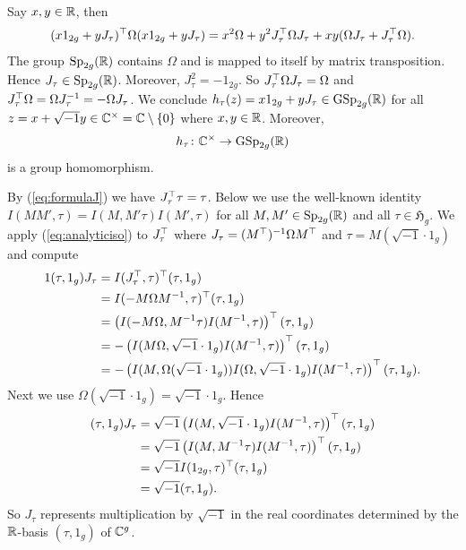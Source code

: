 \documentclass[12pt,oneside]{amsart}
\begin{document}
Say $x,y\in{\mathbb{R}}$, then
\begin{equation*}
  (x1_{2g}+yJ_\tau)^\top \Omega (x1_{2g}+yJ_\tau) = x^2 \Omega +y^2 J_\tau^\top \Omega J_\tau +
  xy(\Omega J_\tau + J_\tau^\top\Omega). 
\end{equation*}
The group $\mathrm{Sp}_{2g}({\mathbb{R}})$ contains $\Omega$ and is mapped to
itself by matrix transposition. Hence $J_\tau\in \mathrm{Sp}_{2g}({\mathbb{R}})$.
Moreover, $J_\tau^2 = -1_{2g}$.
So $J_\tau^\top \Omega J_\tau=\Omega$
and $J_\tau^\top \Omega = \Omega J_\tau^{-1} = -\Omega J_\tau$. We conclude $h_\tau(z) = x 1_{2g}+y J_\tau \in
\mathrm{GSp}_{2g}({\mathbb{R}})$ for all
$z=x+\sqrt{-1}y\in{\mathbb{C}}^\times={\mathbb{C}}\setminus\{0\}$ where $x,y\in{\mathbb{R}}$.
Moreover, 
\begin{equation*}
  h_\tau \colon {\mathbb{C}}^\times \rightarrow\mathrm{GSp}_{2g}({\mathbb{R}})
\end{equation*}
is a group homomorphism. 



By (\ref{eq:formulaJ}) we have $J_\tau^\top \tau = \tau$. 
Below we use the well-known identity $I(MM',\tau)=I(M,M'\tau)I(M',\tau)$ for all $M,M'\in
\mathrm{Sp}_{2g}({\mathbb{R}})$ and all $\tau\in\mathfrak{H}_g$.
We apply  (\ref{eq:analyticiso}) to $J_\tau^\top$
where $J_\tau = (M^\top)^{-1}\Omega M^\top$ and $\tau = M(\sqrt{-1}\cdot 1_g)$
and compute
\begin{alignat*}1
  (\tau,1_g)J_\tau &= I(J_\tau^\trans,\tau)^\trans (\tau,1_g) \\
              &= I(-M\Omega M^{-1},\tau)^\trans(\tau,1_g) \\
              &=  \left( I(-M\Omega,M^{-1}\tau) I(M^{-1},\tau)\right)^\trans  (\tau,1_g) \\
  &=-\left(I(M\Omega,\sqrt{-1} \cdot 1_g)I(M^{-1},\tau)\right)^\trans (\tau,1_g)\\
  &=-\left(I(M,\Omega(\sqrt{-1} \cdot 1_g))I(\Omega,\sqrt{-1}\cdot
    1_g)I(M^{-1},\tau)\right)^\trans(\tau,1_g).%
\end{alignat*}
Next we use $\Omega(\sqrt{-1} \cdot 1_g) = \sqrt{-1}\cdot 1_g$. Hence
\begin{equation}
  \label{eq:Jtauisi}
  \begin{aligned}
    (\tau,1_g)J_\tau&=\sqrt{-1}\left(I(M,\sqrt{-1} \cdot 1_g)I(M^{-1},\tau)\right)^\top(\tau,1_g)\\
    &= \sqrt{-1}\left(I(M,M^{-1}\tau)I(M^{-1},\tau)\right)^\top(\tau,1_g)\\
    &= \sqrt{-1}I(1_{2g},\tau)^\top(\tau,1_g)\\
    &=\sqrt{-1}(\tau,1_g).
  \end{aligned}
\end{equation}
So $J_\tau$ represents multiplication by
$\sqrt{-1}$ in the real coordinates determined by the ${\mathbb{R}}$-basis $(\tau,1_g)$ of
${\mathbb{C}}^g$.
\end{document}
